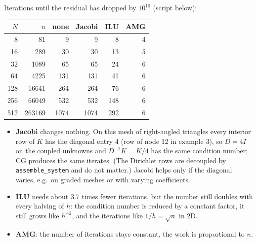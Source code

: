 \begin{center}
\end{center}

 Iterations until the residual has dropped by $10^{10}$ (script below):

\begin{center}
\begin{tabular}{rrrrrr}
  \toprule
  $N$ & $n$ & none & Jacobi & ILU & AMG \\
  \midrule
    8 &     81 &    9 &    9 &   8 & 4 \\
   16 &    289 &   30 &   30 &  13 & 5 \\
   32 &   1089 &   65 &   65 &  24 & 6 \\
   64 &   4225 &  131 &  131 &  41 & 6 \\
  128 &  16641 &  264 &  264 &  76 & 6 \\
  256 &  66049 &  532 &  532 & 148 & 6 \\
  512 & 263169 & 1074 & 1074 & 292 & 6 \\
  \bottomrule
\end{tabular}
\end{center}

\begin{itemize}
  \item \textbf{Jacobi} changes nothing. On this mesh of right-angled triangles every interior row of $K$ has the
    diagonal entry $4$ (row of node 12 in example 3), so $D = 4 I$ on the coupled unknowns and $D^{-1} K = K / 4$ has
    the same condition number; CG produces the same iterates. (The Dirichlet rows are decoupled by
    \texttt{assemble\_system} and do not matter.) Jacobi helps only if the diagonal varies, e.g.\ on graded meshes
    or with varying coefficients.
  \item \textbf{ILU} needs about $3.7$ times fewer iterations, but the number still doubles with every halving of
    $h$: the condition number is reduced by a constant factor, it still grows like $h^{-2}$, and the iterations like
    $1/h = \sqrt n$ in 2D.
  \item \textbf{AMG}: the number of iterations stays constant, the work is proportional to $n$.
\end{itemize}




